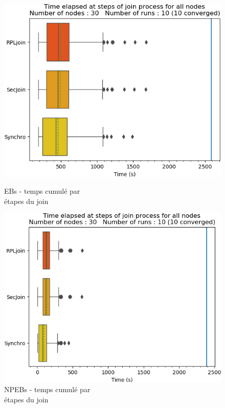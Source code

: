 \documentclass[]{report}
\begin{document}
\begin{figure}[!ht]
	\begin{minipage}{0.49\textwidth}
		\centering
		\includegraphics[width=\textwidth]{results/EB/phase_times}
		\caption{EBs - temps cumulé par\\ \noindent étapes du join}
		\label{fig:EBtimes}
	\end{minipage}\hfill
	\begin{minipage}{0.5\textwidth}
		\centering
		\includegraphics[width=\textwidth]{results/NPEB/phase_times}
		\caption{NPEBs - temps cumulé par\\ étapes du join}
		\label{fig:NPEBtimes}
	\end{minipage}	
\end{figure}
\end{document}
